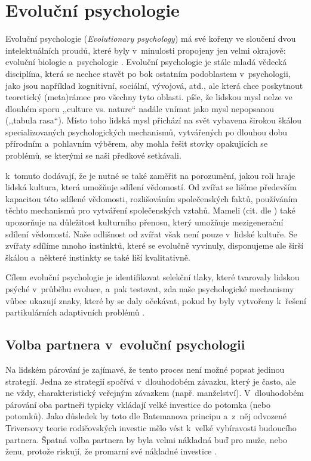 \documentclass[a4paper, 12pt, notitlepage, oneside, numbers=noenddot]{report}
\begin{document}
\section{Evoluční psychologie}
Evoluční psychologie (\textit{Evolutionary psychology}) má své kořeny
ve sloučení dvou intelektuálních proudů, které byly v~minulosti
propojeny jen velmi okrajově: evoluční biologie a~psychologie
\citep{DunbarBarrett2009}.  Evoluční psychologie je stále mladá
vědecká disciplína, která se nechce stavět po bok ostatním podoblastem
v~psychologii, jako jsou například kognitivní, sociální, vývojová, atd.,
ale která chce poskytnout teoretický (meta)rámec pro všechny tyto
oblasti.  \citet{Handbook2005} píše, že lidskou mysl nelze
ve dlouhém sporu ,,culture vs. nature`` nadále vnímat jako mysl
nepopsanou (,,tabula rasa``).  Místo toho lidská mysl přichází na svět
vybavena širokou škálou specializovaných psychologických mechanismů,
vytvářených po dlouhou dobu přírodním a~pohlavním vý\-běr\-em, aby mohla
řešit stovky opakujících se problémů, se kterými se naši předkové
setkávali.

\citet{DunbarBarrett2009} k~tomuto dodávají, že je nutné se také
zaměřit na porozumění, jakou roli hraje lidská kultura, která umožňuje
sdílení vědomostí.  Od zvířat se lišíme především kapacitou této sdílené
vědomosti, rozlišováním společenských faktů, používáním těchto
mechanismů pro vytváření společenských vztahů.  Mameli (cit. dle
\citealp{DunbarBarrett2009}) také upozorňuje na důležitost kulturního
přenosu, který u\-mo\-žňu\-je mezigenerační sdílení vědomostí.  Naše
odlišnost od zvířat však není pouze v~lidské kultuře.  Se zvířaty
sdílíme mnoho instinktů, které se evolučně vyvinuly, disponujeme ale
širší škálou a~některé instinkty se také liší kvalitativně.

Cílem evoluční psychologie je identifikovat selekční tlaky, které
tvarovaly lidskou psýché v~průběhu evoluce, a~pak testovat, zda naše
psychologické mechanismy vůbec ukazují znaky, které by se daly
očekávat, pokud by byly vytvořeny k~řešení partikulárních adaptivních
problémů \citep{BarrettDunbarLycett2007}.

\subsection{Volba partnera v~evoluční psychologii}

Na lidském párování je zajímavé, že tento proces není možné popsat
jedinou strategií.  Jedna ze strategií spočívá v~dlouhodobém závazku,
který je často, ale ne vždy, charakteristický veřejným závazkem
(např. manželství).  V~dlou\-ho\-do\-bém párování oba partneři typicky
vkládají velké investice do potomka (nebo potomků).  Jako důsledek by
toto dle Batemanova principu a~z~něj odvozené Triversovy teorie
rodičovských investic mělo vést k~velké vybíravosti budoucího
partnera.  Špatná volba partnera by byla velmi nákladná buď pro muže,
nebo ženu, protože riskují, že promarní své nákladné investice
\citep{Buss2007}.
\end{document}
